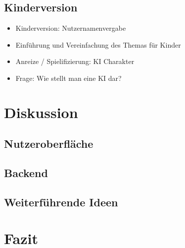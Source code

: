 \documentclass[a4paper]{extarticle}
\begin{document}
    \subsection{Kinderversion}
    \begin{itemize}
        \item Kinderversion: Nutzernamenvergabe
        \item Einführung und Vereinfachung des Themas für Kinder 
        \item Anreize / Spielifizierung: KI Charakter
        \item Frage: Wie stellt man eine KI dar?
    \end{itemize}
    
    \section{Diskussion}
    \subsection{Nutzeroberfläche}
    \subsection{Backend}
    \subsection{Weiterführende Ideen}

    \section{Fazit}
    
\end{document}
